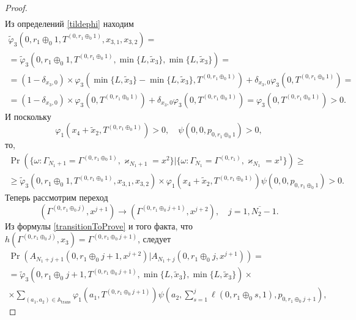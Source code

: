 \begin{proof}
\begin{align*}
\end{align*}
Из определений \eqref{tildephi} находим
\begin{multline*}
\widetilde{\varphi}_3(0, r_1 \oplus_0 1,  T^{(0, r_1 \oplus_0 1)},  x_{3,  1}, x_{3,  2})= \\
=\widetilde{\varphi}_3(0, r_1 \oplus_0 1,  T^{(0, r_1 \oplus_0 1)},  \min\{L,  \tilde{x}_3\},  \min\{L,  \tilde{x}_3\})=\\
= (1-\delta_{x_3,  0}) \times \varphi_3(\min\{L,  \tilde{x}_3\} - \min\{L,  \tilde{x}_3\},  T^{(0, r_1 \oplus_0 1)} ) +\delta_{x_3,  0} \varphi_3 (0,  T^{(0, r_1 \oplus_0 1)}) = \\
=  (1-\delta_{x_3,  0}) \times \varphi_3(0,  T^{(0, r_1 \oplus_0 1)} ) +\delta_{x_3,  0} \varphi_3 (0,  T^{(0, r_1 \oplus_0 1)}) =  \varphi_3(0,  T^{(0, r_1 \oplus_0 1)} ) > 0.
\end{multline*}
И поскольку 
\begin{equation*}
\varphi_1(x_4 + \tilde{x}_2,  T^{(0,  r_1 \oplus_0 1)}) > 0,  \quad \psi(0,  0,  p_{0,  r_1 \oplus_0 1}) > 0, 
\end{equation*}
то, 
\begin{multline*}
\Pr(\{\omega\colon \Gamma_{N_1 + 1}=\Gamma^{(0,  r_1 \oplus_0 1)},  \varkappa_{N_1 + 1}=x^{2}\}|
\{\omega\colon \Gamma_{N_1}=\Gamma^{(0,  r_1)},  \varkappa_{N_1}=x^{1}\})\geqslant \\
\geqslant \widetilde{\varphi}_3(0, r_1 \oplus_0 1,  T^{(0, r_1 \oplus_0 1)},  x_{3,  1}, x_{3,  2})
\times
\varphi_1(x_4 + \tilde{x}_2,  T^{(0,  r_1 \oplus_0 1)}) \psi(0,  0,  p_{0,  r_1 \oplus_0 1})  > 0.
\end{multline*}
Теперь рассмотрим переход 
$$
(\Gamma^{(0,  r_1 \oplus_0 j)},  x^{j+1}) \rightarrow (\Gamma^{(0,  r_1 \oplus_0 j+1)},  x^{j+2}),  \quad j=\overline{1, N_2 - 1}.
$$
Из формулы \eqref{transitionToProve} и того факта,  что $h(\Gamma^{(0,  r_1 \oplus_0 j)},  x_3) = \Gamma^{(0,  r_1 \oplus_0 j + 1 )}$,  следует
\begin{multline*}
\Pr( A_{N_1 + j + 1} (0,  r_1 \oplus_0 j + 1,  x^{j+2})
|A_{N_1 + j} (0,  r_1 \oplus_0 j,  x^{j+1}))
=\\
=\widetilde{\varphi}_3(0,  r_1 \oplus_0 j + 1,  T^{(0,  r_1 \oplus_0 j + 1)},  \min\{L,  \tilde{x}_3\},  \min\{L,  \tilde{x}_3\}) 
\times \\ \times
\sum_{(a_1,  a_2)\in {\mathbb A}_{\mathrm{trans}}}\varphi_1(a_1,  T^{(0,  r_1 \oplus_0 j + 1)}) \psi(a_2,  \sum_{s=1}^{j} \ell(0, r_1 \oplus_0 s, 1) ,  p_{0,  r_1 \oplus_0 j + 1}),
\end{multline*}

\end{proof}
